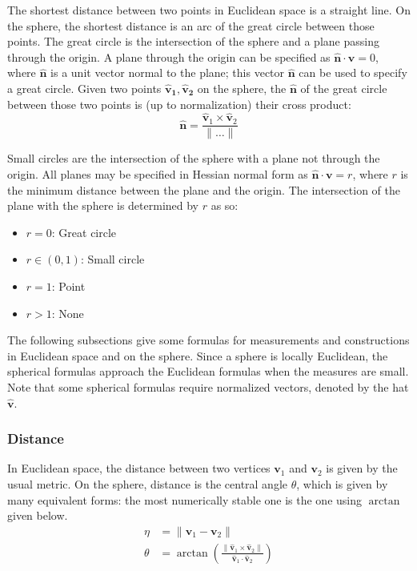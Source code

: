 \documentclass{amsart}[12pt]
\begin{document}
The shortest distance between two points in Euclidean space is a straight line.
On the sphere, the shortest distance is an arc of the great circle between those
points. The great circle is the intersection of the sphere and a plane passing
through the origin. A plane through the origin can be specified as
$\hat{\mathbf n} \cdot \mathbf v = 0$, where $\hat{\mathbf n}$ is a unit vector
normal to the plane; this vector $\hat{\mathbf n}$ can be used to specify a
great circle. Given two points $\mathbf{\hat{v}_1, \hat{v}_2}$ on the sphere,
the $\hat{\mathbf n}$ of the great circle between those two points is (up to
normalization) their cross product:
\begin{equation}
  \mathbf{\hat{n}} =
\frac{\mathbf{\hat{v}}_1 \times \mathbf{\hat{v}}_2}{\|\dots\|}
\end{equation}

Small circles are the intersection of the sphere with a plane not through
the origin. All planes may be specified in Hessian normal form as
$\mathbf{\hat{n}} \cdot \mathbf v = r$, where $r$ is the minimum distance
between the plane and the origin. The intersection of the plane with the sphere
is determined by $r$ as so:

\begin{itemize}
  \item $r = 0$: Great circle
  \item $r \in (0,1)$: Small circle
  \item $r = 1$: Point
  \item $r > 1$: None
\end{itemize}

The following subsections give some formulas for measurements and constructions
in Euclidean space and on the sphere. Since a sphere is locally Euclidean, the
spherical formulas approach the Euclidean formulas when the measures are small.
Note that some spherical formulas require normalized vectors,
denoted by the hat $\mathbf{\hat{v}}$.

\subsubsection{Distance}
In Euclidean space, the distance between two vertices $\mathbf v_1$ and
$\mathbf v_2$ is given by the usual metric. On the sphere, distance is the
central angle $\theta$, which is given by many equivalent forms: the most
numerically stable one is the one using $\arctan$ given below.
\begin{equation}\begin{split}
\eta & = \|\mathbf v_1-\mathbf v_2\| \\
\theta & = \arctan\left(
  \frac{\|\mathbf{\hat{v}}_1 \times \mathbf{\hat{v}}_2\|}
  {\mathbf{\hat{v}}_1 \cdot \mathbf{\hat{v}}_2}\right)
\end{split}\end{equation}
\end{document}

